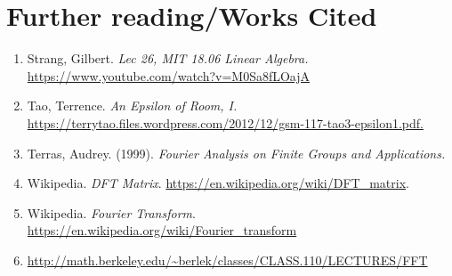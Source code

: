 \documentclass[11pt]{article}
\begin{document}
\section{Further reading/Works Cited}
\begin{enumerate}
\item Strang, Gilbert. \emph{Lec 26, MIT 18.06 Linear Algebra.} \url{https://www.youtube.com/watch?v=M0Sa8fLOajA}
\item Tao, Terrence. \emph{An Epsilon of Room, I.} \url{https://terrytao.files.wordpress.com/2012/12/gsm-117-tao3-epsilon1.pdf.}
\item Terras, Audrey. (1999). \emph{Fourier Analysis on Finite Groups and Applications.}
\item Wikipedia. \emph{DFT Matrix}. \url{https://en.wikipedia.org/wiki/DFT_matrix}.
\item Wikipedia. \emph{Fourier Transform}. \url{https://en.wikipedia.org/wiki/Fourier_transform}
\item \url{http://math.berkeley.edu/~berlek/classes/CLASS.110/LECTURES/FFT}
\end{enumerate}
\end{document}
